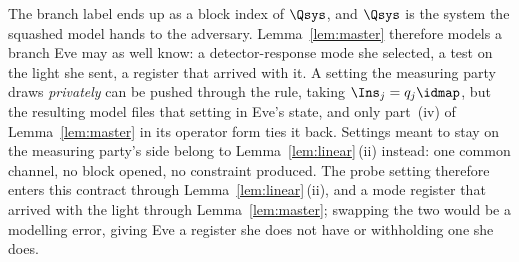 
\begin{remark}\label{rem:master-scope}
The branch label ends up as a block index of $\Qsys$, and $\Qsys$ is the system
the squashed model hands to the adversary. Lemma~\ref{lem:master} therefore
models a branch Eve may as well know: a detector-response mode she selected, a
test on the light she sent, a register that arrived with it. A setting the measuring
party draws \emph{privately} can be pushed through the rule, taking
$\Ins_j=q_j\idmap$, but the resulting model files that setting in Eve's state,
and only part~(iv) of Lemma~\ref{lem:master} in its operator form ties it
back. Settings meant to stay on the measuring party's side belong to
Lemma~\ref{lem:linear}\,(ii) instead: one common channel, no block opened, no
constraint produced. The probe setting therefore enters this contract
through Lemma~\ref{lem:linear}\,(ii), and a mode register that arrived with
the light through Lemma~\ref{lem:master}; swapping the two would be a
modelling error, giving Eve a register she does not have or withholding one
she does.
\end{remark}
